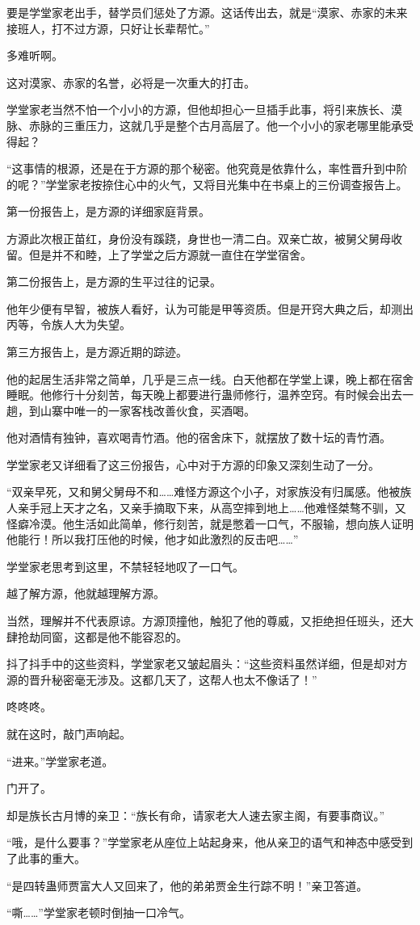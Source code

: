 \begin{this_body}
要是学堂家老出手，替学员们惩处了方源。这话传出去，就是“漠家、赤家的未来接班人，打不过方源，只好让长辈帮忙。”

多难听啊。

这对漠家、赤家的名誉，必将是一次重大的打击。

学堂家老当然不怕一个小小的方源，但他却担心一旦插手此事，将引来族长、漠脉、赤脉的三重压力，这就几乎是整个古月高层了。他一个小小的家老哪里能承受得起？

“这事情的根源，还是在于方源的那个秘密。他究竟是依靠什么，率性晋升到中阶的呢？”学堂家老按捺住心中的火气，又将目光集中在书桌上的三份调查报告上。

第一份报告上，是方源的详细家庭背景。

方源此次根正苗红，身份没有蹊跷，身世也一清二白。双亲亡故，被舅父舅母收留。但是并不和睦，上了学堂之后方源就一直住在学堂宿舍。

第二份报告上，是方源的生平过往的记录。

他年少便有早智，被族人看好，认为可能是甲等资质。但是开窍大典之后，却测出丙等，令族人大为失望。

第三方报告上，是方源近期的踪迹。

他的起居生活非常之简单，几乎是三点一线。白天他都在学堂上课，晚上都在宿舍睡眠。他修行十分刻苦，每天晚上都要进行蛊师修行，温养空窍。有时候会出去一趟，到山寨中唯一的一家客栈改善伙食，买酒喝。

他对酒情有独钟，喜欢喝青竹酒。他的宿舍床下，就摆放了数十坛的青竹酒。

学堂家老又详细看了这三份报告，心中对于方源的印象又深刻生动了一分。

“双亲早死，又和舅父舅母不和……难怪方源这个小子，对家族没有归属感。他被族人亲手冠上天才之名，又亲手摘取下来，从高空摔到地上……他难怪桀骜不驯，又怪癖冷漠。他生活如此简单，修行刻苦，就是憋着一口气，不服输，想向族人证明他能行！所以我打压他的时候，他才如此激烈的反击吧……”

学堂家老思考到这里，不禁轻轻地叹了一口气。

越了解方源，他就越理解方源。

当然，理解并不代表原谅。方源顶撞他，触犯了他的尊威，又拒绝担任班头，还大肆抢劫同窗，这都是他不能容忍的。

抖了抖手中的这些资料，学堂家老又皱起眉头：“这些资料虽然详细，但是却对方源的晋升秘密毫无涉及。这都几天了，这帮人也太不像话了！”

咚咚咚。

就在这时，敲门声响起。

“进来。”学堂家老道。

门开了。

却是族长古月博的亲卫：“族长有命，请家老大人速去家主阁，有要事商议。”

“哦，是什么要事？”学堂家老从座位上站起身来，他从亲卫的语气和神态中感受到了此事的重大。

“是四转蛊师贾富大人又回来了，他的弟弟贾金生行踪不明！”亲卫答道。

“嘶……”学堂家老顿时倒抽一口冷气。

\end{this_body}


